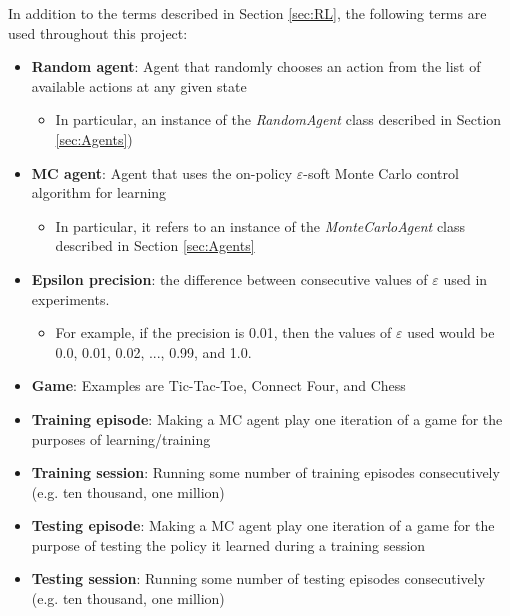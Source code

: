 \documentclass[11pt,a4paper]{report}
\begin{document}
In addition to the terms described in Section \ref{sec:RL}, the following terms are used throughout this project:

\begin{itemize}

	\item \textbf{Random agent}: Agent that randomly chooses an action from the list of available actions at any given state
		\begin{itemize}
			\item In particular, an instance of the \emph{RandomAgent} class described in Section \ref{sec:Agents})
		\end{itemize}

	\item \textbf{MC agent}: Agent that uses the on-policy $\varepsilon$-soft Monte Carlo control algorithm for learning
		\begin{itemize}
			\item In particular, it refers to an instance of the \emph{MonteCarloAgent} class described in Section \ref{sec:Agents}
		\end{itemize}

	\item \textbf{Epsilon precision}: the difference between consecutive values of $\varepsilon$ used in experiments.
		\begin{itemize}
			\item For example, if the precision is 0.01, then the values of $\varepsilon$ used would be 0.0, 0.01, 0.02, ..., 0.99, and 1.0.
		\end{itemize}

	\item \textbf{Game}: Examples are Tic-Tac-Toe, Connect Four, and Chess

	\item \textbf{Training episode}: Making a MC agent play one iteration of a game for the purposes of learning/training

	\item \textbf{Training session}: Running some number of training episodes consecutively (e.g. ten thousand, one million)

	\item \textbf{Testing episode}: Making a MC agent play one iteration of a game for the purpose of testing the policy it learned during a training session

	\item \textbf{Testing session}: Running some number of testing episodes consecutively (e.g. ten thousand, one million)

\end{itemize}
\end{document}
